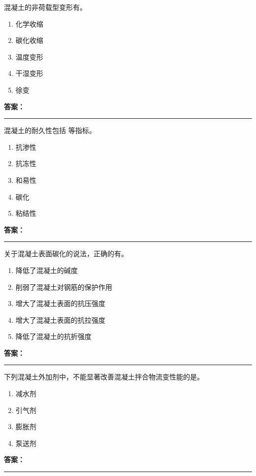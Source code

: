 \documentclass[UTF8,fontset=fandol,11pt]{ctexart}
\newcommand{\answerline}{\textcolor{answerred}{\rule{2.4cm}{0.7pt}}}
\begin{document}
\vspace{0.2em}

\begin{quizbox}[title={第 63 题}]
混凝土的非荷载型变形有。\\
\begin{enumerate}[label=\Alph*.]
\item 化学收缩
\item 碳化收缩
\item 温度变形
\item 干湿变形
\item 徐变
\end{enumerate}
\textbf{\textcolor{answerred}{答案：}} \answerline
\end{quizbox}

\vspace{0.2em}

\begin{quizbox}[title={第 64 题}]
混凝土的耐久性包括 等指标。\\
\begin{enumerate}[label=\Alph*.]
\item 抗渗性
\item 抗冻性
\item 和易性
\item 碳化
\item 粘结性
\end{enumerate}
\textbf{\textcolor{answerred}{答案：}} \answerline
\end{quizbox}

\vspace{0.2em}

\begin{quizbox}[title={第 65 题}]
关于混凝土表面碳化的说法，正确的有。\\
\begin{enumerate}[label=\Alph*.]
\item 降低了混凝土的碱度
\item 削弱了混凝土对钢筋的保护作用
\item 增大了混凝土表面的抗压强度
\item 增大了混凝土表面的抗拉强度
\item 降低了混凝土的抗折强度
\end{enumerate}
\textbf{\textcolor{answerred}{答案：}} \answerline
\end{quizbox}

\vspace{0.2em}

\begin{quizbox}[title={第 66 题}]
下列混凝土外加剂中，不能显著改善混凝土拌合物流变性能的是。\\
\begin{enumerate}[label=\Alph*.]
\item 减水剂
\item 引气剂
\item 膨胀剂
\item 泵送剂
\end{enumerate}
\textbf{\textcolor{answerred}{答案：}} \answerline
\end{quizbox}
\end{document}
